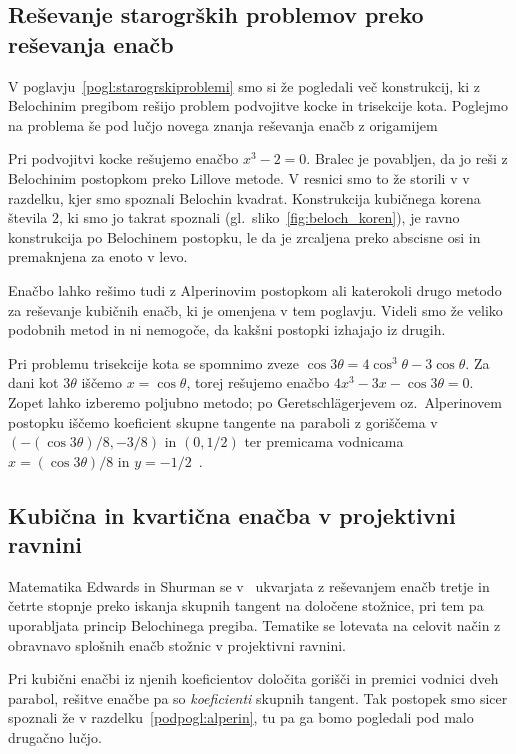 \subsection{Reševanje starogrških problemov preko reševanja enačb}

V poglavju~\ref{pogl:starogrskiproblemi} smo si že pogledali več konstrukcij, ki z Belochinim pregibom rešijo problem podvojitve kocke in trisekcije kota. Poglejmo na problema še pod lučjo novega znanja reševanja enačb z origamijem

Pri podvojitvi kocke rešujemo enačbo $x^3 - 2 = 0$. Bralec je povabljen, da jo reši z Belochinim postopkom preko Lillove metode. V resnici smo to že storili v v razdelku, kjer smo spoznali Belochin kvadrat. Konstrukcija kubičnega korena števila $2$, ki smo jo takrat spoznali (gl.\ sliko~\ref{fig:beloch_koren}), je ravno konstrukcija po Belochinem postopku, le da je zrcaljena preko abscisne osi in premaknjena za enoto v levo.

Enačbo lahko rešimo tudi z Alperinovim postopkom ali katerokoli drugo metodo za reševanje kubičnih enačb, ki je omenjena v tem poglavju. Videli smo že veliko podobnih metod in ni nemogoče, da kakšni postopki izhajajo iz drugih.

Pri problemu trisekcije kota se spomnimo zveze $\cos 3\theta = 4 \cos^3 \theta - 3 \cos \theta$. Za dani kot $3 \theta$ iščemo $x = \cos \theta$, torej rešujemo enačbo $4x^3-3x-\cos 3\theta=0$. Zopet lahko izberemo poljubno metodo; po Geretschlägerjevem oz.\ Alperinovem postopku iščemo koeficient skupne tangente na paraboli z goriščema v $(-(\cos 3 \theta) / 8, -3/8)$ in $(0, 1/2)$ ter premicama vodnicama $x = (\cos 3 \theta) / 8$ in $y = -1/2$~\cite[str.\ 370]{geret1995}.

\subsection{Kubična in kvartična enačba v projektivni ravnini}
\label{podpogl:afina_proj_enacbe}

Matematika Edwards in Shurman se v~\cite{edwards2001} ukvarjata z reševanjem enačb tretje in četrte stopnje preko iskanja skupnih tangent na določene stožnice, pri tem pa uporabljata princip Belochinega pregiba. Tematike se lotevata na celovit način z obravnavo splošnih enačb stožnic v projektivni ravnini.

Pri kubični enačbi iz njenih koeficientov določita gorišči in premici vodnici dveh parabol, rešitve enačbe pa so \emph{koeficienti} skupnih tangent. Tak postopek smo sicer spoznali že v razdelku~\ref{podpogl:alperin}, tu pa ga bomo pogledali pod malo drugačno lučjo.

